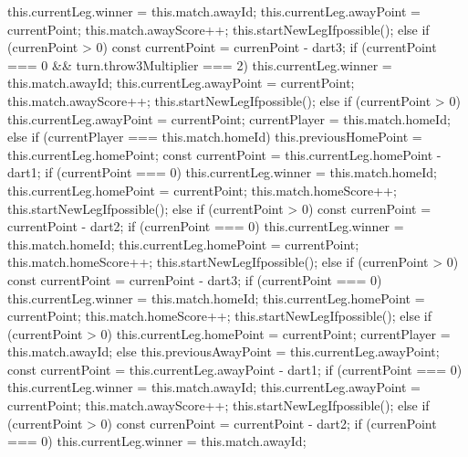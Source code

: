 \begin{cpp}
{{{{{{              this.currentLeg.winner = this.match.awayId;
              this.currentLeg.awayPoint = currentPoint;
              this.match.awayScore++;
              this.startNewLegIfpossible();
            } else if (currenPoint > 0) {
              const currentPoint = currenPoint - dart3;
              if (currentPoint === 0 && turn.throw3Multiplier === 2) {
                this.currentLeg.winner = this.match.awayId;
                this.currentLeg.awayPoint = currentPoint;
                this.match.awayScore++;
                this.startNewLegIfpossible();
              } else if (currentPoint > 0) {
                this.currentLeg.awayPoint = currentPoint;
              }
            }
          }
          currentPlayer = this.match.homeId;
        }
      } else {
        if (currentPlayer === this.match.homeId) {
          this.previousHomePoint = this.currentLeg.homePoint;
          const currentPoint = this.currentLeg.homePoint - dart1;
          if (currentPoint === 0) {
            this.currentLeg.winner = this.match.homeId;
            this.currentLeg.homePoint = currentPoint;
            this.match.homeScore++;
            this.startNewLegIfpossible();
          } else if (currentPoint > 0) {
            const currenPoint = currentPoint - dart2;
            if (currenPoint === 0) {
              this.currentLeg.winner = this.match.homeId;
              this.currentLeg.homePoint = currentPoint;
              this.match.homeScore++;
              this.startNewLegIfpossible();
            } else if (currenPoint > 0) {
              const currentPoint = currenPoint - dart3;
              if (currentPoint === 0) {
                this.currentLeg.winner = this.match.homeId;
                this.currentLeg.homePoint = currentPoint;
                this.match.homeScore++;
                this.startNewLegIfpossible();
              } else if (currentPoint > 0) {
                this.currentLeg.homePoint = currentPoint;
              }
            }
          }
          currentPlayer = this.match.awayId;
        } else {
          this.previousAwayPoint = this.currentLeg.awayPoint;
          const currentPoint = this.currentLeg.awayPoint - dart1;
          if (currentPoint === 0) {
            this.currentLeg.winner = this.match.awayId;
            this.currentLeg.awayPoint = currentPoint;
            this.match.awayScore++;
            this.startNewLegIfpossible();
          } else if (currentPoint > 0) {
            const currenPoint = currentPoint - dart2;
            if (currenPoint === 0) {
              this.currentLeg.winner = this.match.awayId;
}}}}}}
\end{cpp}
